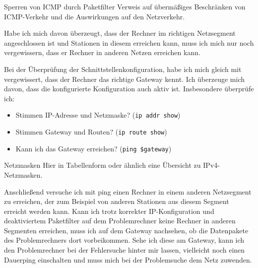 \begin{normaltext}
\begin{Exkursbox}{Sperren von ICMP durch Paketfilter}
  Verweis auf übermäßiges Beschränken von ICMP-Verkehr und die Auswirkungen
  auf den Netzverkehr.
\end{Exkursbox}

Habe ich mich davon überzeugt, dass der Rechner im richtigen Netzsegment
angeschlossen ist und Stationen in diesem erreichen kann, muss ich mich nur
noch vergewissern, dass er Rechner in anderen Netzen erreichen kann.

Bei der Überprüfung der Schnittstellenkonfiguration, habe ich mich gleich mit
vergewissert, dass der Rechner das richtige Gateway kennt. Ich überzeuge mich
davon, dass die konfigurierte Konfiguration auch aktiv ist. Insbesondere
überprüfe ich:

\begin{itemize}
  \item Stimmen IP-Adresse und Netzmaske? (\verb?ip addr show?)
  \item Stimmen Gateway und Routen? (\verb?ip route show?)
  \item Kann ich das Gateway erreichen? (\verb?ping $gateway?)
\end{itemize}

\begin{Exkursbox}{Netzmasken}
  Hier in Tabellenform oder ähnlich eine Übersicht zu IPv4-Netzmasken.
\end{Exkursbox}

Anschließend versuche ich mit ping einen Rechner in einem anderen
Netzsegment zu erreichen, der zum Beispiel von anderen Stationen
aus diesem Segment erreicht werden kann. Kann ich trotz korrekter
IP-Konfiguration und deaktiviertem Paketfilter auf dem Problemrechner keine
Rechner in anderen Segmenten erreichen, muss ich auf dem Gateway nachsehen, ob
die Datenpakete des Problemrechners dort vorbeikommen. Sehe ich diese am
Gateway, kann ich den Problemrechner bei der Fehlersuche hinter mir lassen,
vielleicht noch einen Dauerping einschalten und muss mich bei der Problemsuche
dem Netz zuwenden.

\end{normaltext}



